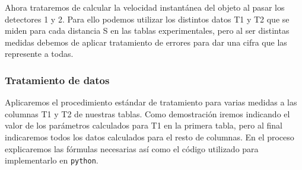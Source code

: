 \documentclass[12pt, a4paper, titlepage]{article}
\newcommand{\code}[1]{\texttt{#1}} %
\begin{document}
  Ahora trataremos de calcular la velocidad instantánea del objeto al pasar los detectores 1 y 2. Para ello podemos utilizar los distintos datos T1 y T2 que se miden para cada distancia S en las tablas experimentales, pero al ser distintas medidas debemos de aplicar tratamiento de errores para dar una cifra que las represente a todas.

  \subsubsection{Tratamiento de datos}
  \label{s:tratamientodatos}

  Aplicaremos el procedimiento estándar de tratamiento para varias medidas a las columnas T1 y T2 de nuestras tablas. Como demostración iremos indicando el valor de los parámetros calculados para T1 en la primera tabla, pero al final indicaremos todos los datos calculados para el resto de columnas. En el proceso explicaremos las fórmulas necesarias así como el código utilizado para implementarlo en \code{python}.
\end{document}
